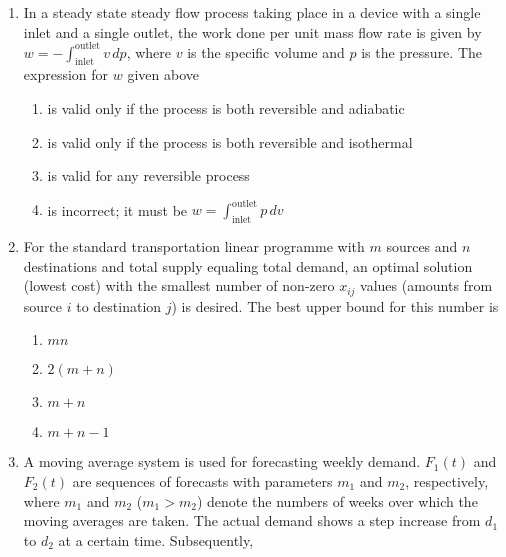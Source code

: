 \documentclass[journal]{IEEEtran}
\numberwithin{equation}{enumi}
\numberwithin{figure}{enumi}
\begin{document}
\begin{enumerate}
\begin{enumerate}
\end{enumerate}
\item In a steady state steady flow process taking place in a device with a single inlet and a single outlet, the work done per unit mass flow rate is given by $w = - \int_{\text{inlet}}^{\text{outlet}} v \, dp$, where $ v $ is the specific volume and $ p $ is the pressure. The expression for $ w $ given above

\begin{enumerate}
 
    \item is valid only if the process is both reversible and adiabatic
    \item is valid only if the process is both reversible and isothermal
    \item is valid for any reversible process
    \item is incorrect; it must be $w=\int_{\text{inlet}}^{\text{outlet}} p \, dv $
\end{enumerate}
\item For the standard transportation linear programme with $m$ sources and $n$ destinations and total supply equaling total demand, an optimal solution (lowest cost) with the smallest number of non-zero $x_{ij}$ values (amounts from source $i$ to destination $j$) is desired. The best upper bound for this number is

\begin{enumerate}
    \item $mn$
    \item $2(m + n)$
    \item $m + n$
    \item $m + n - 1$
\end{enumerate}
\item A moving average system is used for forecasting weekly demand. $F_1(t)$ and $F_2(t)$ are sequences of forecasts with parameters $m_1$ and $m_2$, respectively, where $m_1$ and $m_2$ ($m_1 > m_2$) denote the numbers of weeks over which the moving averages are taken. The actual demand shows a step increase from $d_1$ to $d_2$ at a certain time. Subsequently,


\end{enumerate}
\end{document}
